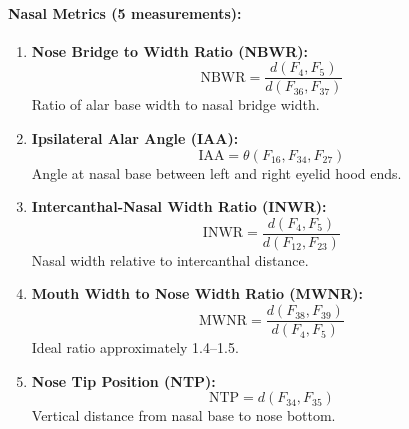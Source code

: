 \paragraph{Nasal Metrics (5 measurements):}
\begin{enumerate}[resume]
    \item \textbf{Nose Bridge to Width Ratio (NBWR):}
    \begin{equation}
    \text{NBWR} = \frac{d(F_4, F_5)}{d(F_{36}, F_{37})}
    \end{equation}
    Ratio of alar base width to nasal bridge width.
    
    \item \textbf{Ipsilateral Alar Angle (IAA):}
    \begin{equation}
    \text{IAA} = \theta(F_{16}, F_{34}, F_{27})
    \end{equation}
    Angle at nasal base between left and right eyelid hood ends.
    
    \item \textbf{Intercanthal-Nasal Width Ratio (INWR):}
    \begin{equation}
    \text{INWR} = \frac{d(F_4, F_5)}{d(F_{12}, F_{23})}
    \end{equation}
    Nasal width relative to intercanthal distance.
    
    \item \textbf{Mouth Width to Nose Width Ratio (MWNR):}
    \begin{equation}
    \text{MWNR} = \frac{d(F_{38}, F_{39})}{d(F_4, F_5)}
    \end{equation}
    Ideal ratio approximately 1.4--1.5.
    
    \item \textbf{Nose Tip Position (NTP):}
    \begin{equation}
    \text{NTP} = d(F_{34}, F_{35})
    \end{equation}
    Vertical distance from nasal base to nose bottom.
\end{enumerate}

